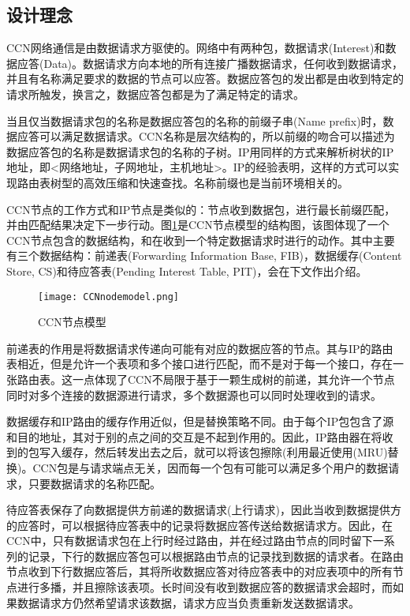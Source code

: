 \subsection{设计理念}
\par
CCN网络通信是由数据请求方驱使的。网络中有两种包，数据请求(Interest)和数据应答(Data)。数据请求方向本地的所有连接广播数据请求，任何收到数据请求，并且有名称满足要求的数据的节点可以应答。数据应答包的发出都是由收到特定的请求所触发，换言之，数据应答包都是为了满足特定的请求。
\par
当且仅当数据请求包的名称是数据应答包的名称的前缀子串(Name prefix)时，数据应答可以满足数据请求。CCN名称是层次结构的，所以前缀的吻合可以描述为数据应答包的名称是数据请求包的名称的子树。IP用同样的方式来解析树状的IP地址，即<网络地址，子网地址，主机地址>。IP的经验表明，这样的方式可以实现路由表树型的高效压缩和快速查找。名称前缀也是当前环境相关的。
\par
CCN节点的工作方式和IP节点是类似的：节点收到数据包，进行最长前缀匹配，并由匹配结果决定下一步行动。图\ref{fig:NodeLogic}是CCN节点模型的结构图，该图体现了一个CCN节点包含的数据结构，和在收到一个特定数据请求时进行的动作。其中主要有三个数据结构：前递表(Forwarding Information Base, FIB)，数据缓存(Content Store, CS)和待应答表(Pending Interest Table, PIT)，会在下文作出介绍。\cite{NDNDSRef}
\begin{figure}[h!]
	\centering
	\texttt{[image: CCNnodemodel.png]}
	\caption{CCN节点模型}
	\label{fig:NodeLogic}
\end{figure}
\par
前递表的作用是将数据请求传递向可能有对应的数据应答的节点。其与IP的路由表相近，但是允许一个表项和多个接口进行匹配，而不是对于每一个接口，存在一张路由表。这一点体现了CCN不局限于基于一颗生成树的前递，其允许一个节点同时对多个连接的数据源进行请求，多个数据源也可以同时处理收到的请求。
\par
数据缓存和IP路由的缓存作用近似，但是替换策略不同。由于每个IP包包含了源和目的地址，其对于别的点之间的交互是不起到作用的。因此，IP路由器在将收到的包写入缓存，然后转发出去之后，就可以将该包擦除(利用最近使用(MRU)替换)。CCN包是与请求端点无关，因而每一个包有可能可以满足多个用户的数据请求，只要数据请求的名称匹配。
\par
待应答表保存了向数据提供方前递的数据请求(上行请求)，因此当收到数据提供方的应答时，可以根据待应答表中的记录将数据应答传送给数据请求方。因此，在CCN中，只有数据请求包在上行时经过路由，并在经过路由节点的同时留下一系列的记录，下行的数据应答包可以根据路由节点的记录找到数据的请求者。在路由节点收到下行数据应答后，其将所收数据应答对待应答表中的对应表项中的所有节点进行多播，并且擦除该表项。长时间没有收到数据应答的数据请求会超时，而如果数据请求方仍然希望请求该数据，请求方应当负责重新发送数据请求。
